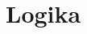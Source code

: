 \documentclass[12pt,a4paper,notitlepage,final]{article}
\begin{document}
\section{Logika}
\end{document}
